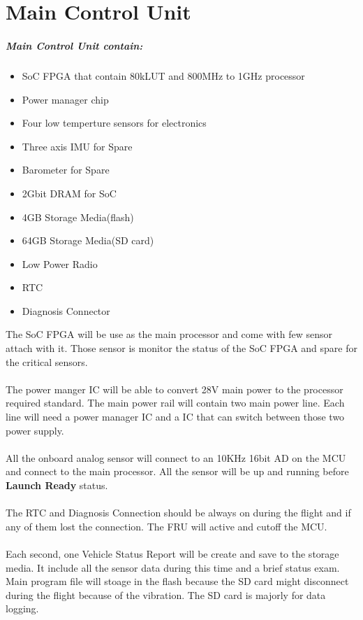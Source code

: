 \documentclass[12pt,article]{memoir}
\begin{document}
\section{Main Control Unit}
\subparagraph{Main Control Unit contain:}
\begin{itemize}
	\item SoC FPGA that contain 80kLUT and 800MHz to 1GHz processor
	\item Power manager chip 
	\item Four low temperture sensors for electronics
	\item Three axis IMU for Spare
	\item Barometer for Spare
	\item 2Gbit DRAM for SoC
	\item 4GB Storage Media(flash)
	\item 64GB Storage Media(SD card)
	\item Low Power Radio
	\item RTC
	\item Diagnosis Connector
\end{itemize}
The SoC FPGA will be use as the main processor and come with few sensor attach with it. Those sensor is monitor the status of the SoC FPGA and spare for the critical sensors.\\\\
The power manger IC will be able to convert 28V main power to the processor required standard. The main power rail will contain two main power line. Each line will need a power manager IC and a IC that can switch between those two power supply.\\\\
All the onboard analog sensor will connect to an 10KHz 16bit AD on the MCU and connect to the main processor. All the sensor will be up and running before \textbf{Launch Ready} status.\\\\
The RTC and Diagnosis Connection should be always on during the flight and if any of them lost the connection. The FRU will active and cutoff the MCU.\\\\
Each second, one Vehicle Status Report will be create and save to the storage media. It include all the sensor data during this time and a brief status exam. Main program file will stoage in the flash because the SD card might disconnect during the flight because of the vibration. The SD card is majorly for data logging.
\end{document}
